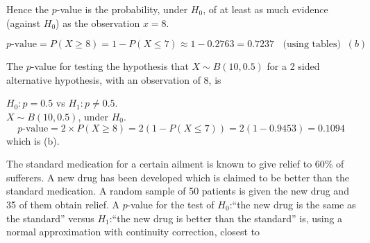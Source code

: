 \documentclass[bigtut]{tutorial}
\begin{document}
\begin{tutorial}
\begin{questions}
\begin{solution}
Hence the $p$-value is the probability, under $H_{0}$, of at least as much evidence (against $H_0$) as the observation $x=8$.

\[ p\mbox{-value} = P(X \geq 8)  = 1-P(X\leq 7) \approx 1-0.2763 = 0.7237 \;\;  \text{ (using tables)} \;\; (b) \]
\end{solution}


\question
The $p$-value for testing the hypothesis that $X \sim B(10,0.5)$ for a 2 sided alternative hypothesis, with an observation of 8, is 

\begin{solution}
 $H_0: p=0.5$ vs $H_1: p \neq 0.5$. \\

 $X \sim B(10,0.5)$, under $H_0$. \\

\[ p\mbox{-value} = 2 \times P(X \geq 8)  = 2(1-P(X \leq 7)) =2(1-0.9453) = 0.1094 \]
which is (b).
\end{solution}

\question
The standard medication for a certain ailment is known to give relief to 60\% of sufferers. A new drug has been developed which is claimed to be better than the standard medication. A random sample of 50 patients is given the new drug and 35 of them obtain relief. A $p$-value for the test of $H_0$:“the new drug is the same as the standard” versus $H_1$:“the new drug is better than the standard” is, using a normal approximation with continuity correction, closest to
\begin{parts}[5]

\end{parts}
\end{questions}
\end{tutorial}
\end{document}
